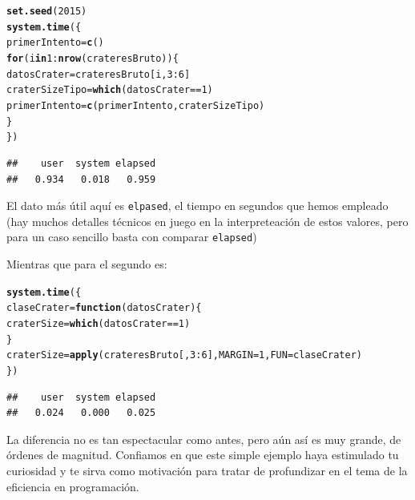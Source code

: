 \documentclass[10pt,a4paper]{article}\usepackage[]{graphicx}\usepackage[]{color}
\makeatletter
\newcommand{\hlnum}[1]{\textcolor[rgb]{0.686,0.059,0.569}{#1}}%
\newcommand{\hlopt}[1]{\textcolor[rgb]{0,0,0}{#1}}%
\newcommand{\hlstd}[1]{\textcolor[rgb]{0.345,0.345,0.345}{#1}}%
\newcommand{\hlkwa}[1]{\textcolor[rgb]{0.161,0.373,0.58}{\textbf{#1}}}%
\newcommand{\hlkwb}[1]{\textcolor[rgb]{0.69,0.353,0.396}{#1}}%
\newcommand{\hlkwc}[1]{\textcolor[rgb]{0.333,0.667,0.333}{#1}}%
\newcommand{\hlkwd}[1]{\textcolor[rgb]{0.737,0.353,0.396}{\textbf{#1}}}%
\newenvironment{kframe}{%
 \def\at@end@of@kframe{}%
 \ifinner\ifhmode%
  \def\at@end@of@kframe{\end{minipage}}%
  \begin{minipage}{\columnwidth}%
 \fi\fi%
 \def\FrameCommand##1{\hskip\@totalleftmargin \hskip-\fboxsep
 \colorbox{shadecolor}{##1}\hskip-\fboxsep
     \hskip-\linewidth \hskip-\@totalleftmargin \hskip\columnwidth}%
 \MakeFramed {\advance\hsize-\width
   \@totalleftmargin\z@ \linewidth\hsize
   \@setminipage}}%
 {\par\unskip\endMakeFramed%
 \at@end@of@kframe}
\newenvironment{knitrout}{}{} %
\makeatother
\begin{document}
\begin{knitrout}
\color{fgcolor}\begin{kframe}
\begin{alltt}
\hlkwd{set.seed}\hlstd{(}\hlnum{2015}\hlstd{)}
\hlkwd{system.time}\hlstd{(\{}
  \hlstd{primerIntento} \hlkwb{=} \hlkwd{c}\hlstd{()}
  \hlkwa{for}\hlstd{(i} \hlkwa{in} \hlnum{1}\hlopt{:}\hlkwd{nrow}\hlstd{(crateresBruto))\{}
    \hlstd{datosCrater} \hlkwb{=} \hlstd{crateresBruto[i,} \hlnum{3}\hlopt{:}\hlnum{6}\hlstd{]}
    \hlstd{craterSizeTipo} \hlkwb{=} \hlkwd{which}\hlstd{(datosCrater} \hlopt{==} \hlnum{1}\hlstd{)}
    \hlstd{primerIntento} \hlkwb{=} \hlkwd{c}\hlstd{(primerIntento, craterSizeTipo)}
  \hlstd{\}}
\hlstd{\})}
\end{alltt}
\begin{verbatim}
##    user  system elapsed 
##   0.934   0.018   0.959
\end{verbatim}
\end{kframe}
\end{knitrout}
El dato más útil aquí es {\tt elpased}, el tiempo en segundos que hemos empleado (hay muchos detalles técnicos en juego en la interpreteación de estos valores, pero para un caso sencillo basta con comparar {\tt elapsed})

Mientras que para el segundo es:
\begin{knitrout}
\color{fgcolor}\begin{kframe}
\begin{alltt}
\hlkwd{system.time}\hlstd{(\{}
  \hlstd{claseCrater} \hlkwb{=} \hlkwa{function}\hlstd{(}\hlkwc{datosCrater}\hlstd{)\{}
    \hlstd{craterSize} \hlkwb{=} \hlkwd{which}\hlstd{(datosCrater} \hlopt{==} \hlnum{1}\hlstd{)}
  \hlstd{\}}
\hlstd{craterSize} \hlkwb{=} \hlkwd{apply}\hlstd{(crateresBruto[,} \hlnum{3}\hlopt{:}\hlnum{6}\hlstd{],} \hlkwc{MARGIN} \hlstd{=} \hlnum{1}\hlstd{,} \hlkwc{FUN} \hlstd{= claseCrater)}
\hlstd{\})}
\end{alltt}
\begin{verbatim}
##    user  system elapsed 
##   0.024   0.000   0.025
\end{verbatim}
\end{kframe}
\end{knitrout}
La diferencia no es tan espectacular como antes, pero aún así es muy grande, de órdenes de magnitud. Confiamos en que este simple ejemplo haya estimulado tu curiosidad y te sirva como motivación para tratar de profundizar en el tema de la eficiencia en programación.
\end{document}
